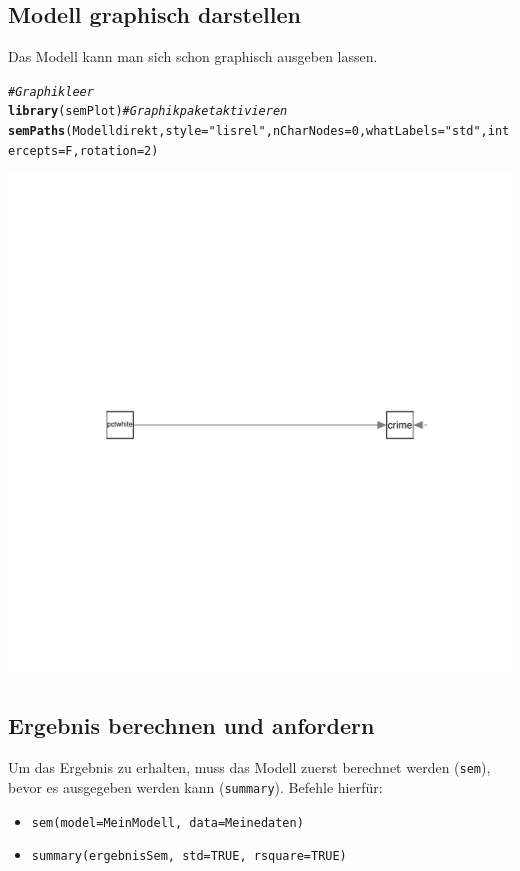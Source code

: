 \documentclass[a4paper]{article}\usepackage[]{graphicx}\usepackage[]{color}
\makeatletter
\def\maxwidth{ %
  \ifdim\Gin@nat@width>\linewidth
    \linewidth
  \else
    \Gin@nat@width
  \fi
}
\newcommand{\hlnum}[1]{\textcolor[rgb]{0.686,0.059,0.569}{#1}}%
\newcommand{\hlstr}[1]{\textcolor[rgb]{0.192,0.494,0.8}{#1}}%
\newcommand{\hlcom}[1]{\textcolor[rgb]{0.678,0.584,0.686}{\textit{#1}}}%
\newcommand{\hlstd}[1]{\textcolor[rgb]{0.345,0.345,0.345}{#1}}%
\newcommand{\hlkwc}[1]{\textcolor[rgb]{0.333,0.667,0.333}{#1}}%
\newcommand{\hlkwd}[1]{\textcolor[rgb]{0.737,0.353,0.396}{\textbf{#1}}}%
\newenvironment{kframe}{%
 \def\at@end@of@kframe{}%
 \ifinner\ifhmode%
  \def\at@end@of@kframe{\end{minipage}}%
  \begin{minipage}{\columnwidth}%
 \fi\fi%
 \def\FrameCommand##1{\hskip\@totalleftmargin \hskip-\fboxsep
 \colorbox{shadecolor}{##1}\hskip-\fboxsep
     \hskip-\linewidth \hskip-\@totalleftmargin \hskip\columnwidth}%
 \MakeFramed {\advance\hsize-\width
   \@totalleftmargin\z@ \linewidth\hsize
   \@setminipage}}%
 {\par\unskip\endMakeFramed%
 \at@end@of@kframe}
\newenvironment{knitrout}{}{} %
\makeatother
\begin{document}
\subsection{Modell graphisch darstellen}
Das Modell kann man sich schon graphisch ausgeben lassen.

\begin{knitrout}
\color{fgcolor}\begin{kframe}
\begin{alltt}
\hlcom{# Graphik leer}
\hlkwd{library}\hlstd{(semPlot)} \hlcom{# Graphikpaket aktivieren}
\hlkwd{semPaths}\hlstd{(Modelldirekt,} \hlkwc{style}\hlstd{=}\hlstr{"lisrel"}\hlstd{,}\hlkwc{nCharNodes} \hlstd{=} \hlnum{0}\hlstd{,} \hlkwc{whatLabels}\hlstd{=}\hlstr{"std"}\hlstd{,}\hlkwc{intercepts} \hlstd{= F,}\hlkwc{rotation}\hlstd{=}\hlnum{2}\hlstd{)}
\end{alltt}
\end{kframe}
\includegraphics[width=\maxwidth]{figure/unnamed-chunk-4-1} 

\end{knitrout}

\subsection{Ergebnis berechnen und anfordern}
Um das Ergebnis zu erhalten, muss das Modell zuerst berechnet werden (\texttt{sem}), bevor es ausgegeben werden kann (\texttt{summary}). Befehle hierf\"ur:
\begin{itemize}
  \item \texttt{sem(model=MeinModell, data=Meinedaten)}
  \item \texttt{summary(ergebnisSem, std=TRUE, rsquare=TRUE)}
\end{itemize}
\end{document}

